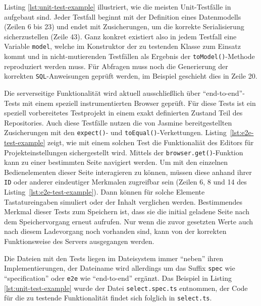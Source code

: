 

Listing \ref{lst:unit-test-example} illustriert, wie die meisten Unit-Testfälle in \idename{} aufgebaut sind. Jeder Testfall beginnt mit der Definition eines Datenmodells (Zeilen 6 bis 23) und endet mit Zusicherungen, um die korrekte Serialisierung sicherzustellen (Zeile 43). Ganz konkret existiert also in jedem Testfall eine Variable \texttt{model}, welche im Konstruktor der zu testenden Klasse zum Einsatz kommt und in nicht-mutierenden Testfällen als Ergebnis der \texttt{toModel()}-Methode reproduziert werden muss. Für Abfragen muss noch die Generierung der korrekten \texttt{SQL}-Anweisungen geprüft werden, im Beispiel geschieht dies in Zeile 20.

Die serverseitige Funktionalität wird aktuell ausschließlich über "`end-to-end"'-Tests mit einem speziell instrumentierten Browser geprüft. Für diese Tests ist ein speziell vorbereitetes Testprojekt in einem exakt definierten Zustand Teil des Repositories. Auch diese Testfälle nutzen die von Jasmine bereitgestellten Zusicherungen mit den \texttt{expect()}- und \texttt{toEqual()}-Verkettungen. Listing~\ref{lst:e2e-test-example} zeigt, wie mit einem solchen Test die Funktionaliät des Editors für Projekteinstellungen sichergestellt wird. Mittels der \texttt{browser.get()}-Funktion kann zu einer bestimmten Seite navigiert werden. Um mit den einzelnen Bedienelementen dieser Seite interagieren zu können, müssen diese anhand ihrer \texttt{ID} oder anderer eindeutiger Merkmalen zugreifbar sein (Zeilen 6, 8 und 14 des Listing~\ref{lst:e2e-test-example}). Dann können für solche Elemente Tastatureingaben simuliert oder der Inhalt verglichen werden. Bestimmendes Merkmal dieser Tests zum Speichern ist, dass sie die initial geladene Seite nach dem Speichervorgang erneut aufrufen. Nur wenn die zuvor gesetzten Werte auch nach diesem Ladevorgang noch vorhanden sind, kann von der korrekten Funktionsweise des Servers ausgegangen werden.

Die Dateien mit den Tests liegen im Dateisystem immer "`neben"' ihren Implementierungen, der Dateiname wird allerdings um das Suffix \texttt{spec} wie "`specification"' oder \texttt{e2e} wie "`end-to-end"' ergänzt. Das Beispiel in Listing  \ref{lst:unit-test-example} wurde der Datei \texttt{select.spec.ts} entnommen, der Code für die zu testende Funktionalität findet sich folglich in \texttt{select.ts}.


